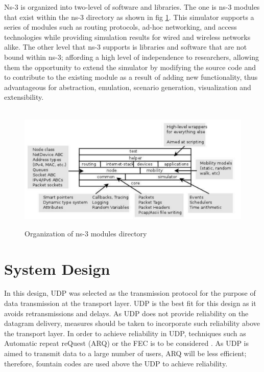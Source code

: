 Ns-3 is organized into two-level of software and libraries. 
The one is ns-3 modules that exist within the ns-3 directory as shown in fig \ref{ns3org}. This simulator supports a series of modules such as routing protocols, ad-hoc networking, and access technologies while providing simulation results for wired and wireless networks alike. 
The other level that ns-3 supports is libraries and software that are not bound within ns-3; affording a high level of independence to researchers, allowing them the opportunity to extend the simulator by modifying the source code and to contribute to the existing module as a result of adding new functionality, thus advantageous for abstraction, emulation, scenario generation, visualization and extensibility.
\begin{figure}[htbp]
\begin{center}
\mbox{
\includegraphics[width=5.5in]{Figures/ns3org}}
\caption{Organization of ns-3 modules directory}
\label{ns3org}
\end{center}
\end{figure}

\section{System Design}
\label{sys_design_sec}

In this design, UDP was selected as the transmission protocol for the purpose of data transmission at the transport layer. UDP is the best fit for this design as it avoids retransmissions and delays. As UDP does not provide reliability on the datagram delivery, measures should be taken to incorporate such reliability above the transport layer. In order to achieve reliability in UDP, techniques such as Automatic repeat reQuest (ARQ) or the FEC is to be considered \cite{farrell2006essentials}. As UDP is aimed to transmit data to a large number of users, ARQ will be less efficient; therefore, fountain codes are used above the UDP to achieve reliability. 


